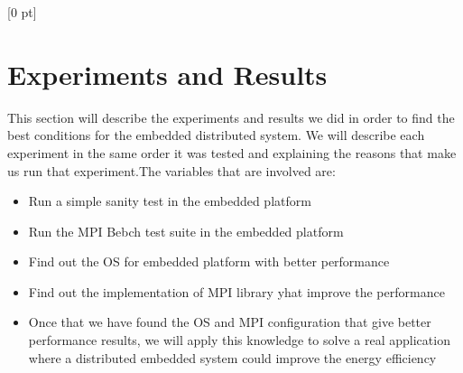 \titlespacing{\chapter}{0 pt}{30 pt}{50 pt}[0 pt]
\titleformat{\section}{\Large\bfseries}{\thesection}{0 pt}{\hspace{30 pt}}
\titleformat{\subsection}{\large\bfseries}{\thesubsection}{0 pt}{\hspace{30 pt}}
\pagestyle{fancy}
\fancyhead[LO,LE]{\footnotesize\emph{\leftmark}}
\fancyhead[RO,RE]{\thepage}
\fancyfoot[CO,CE]{}

\chapter{Experiments and Results}

\normalsize
\noindent

This section will describe the experiments and results we did in order to find
the best conditions for the embedded distributed system. We will describe each
experiment in the same order it was tested and explaining the reasons that make
us run that experiment.The variables that are involved are: 

\begin{itemize}
\item Run a simple sanity test in the embedded platform
\item Run the MPI Bebch test suite in the embedded platform
\item Find out the OS for embedded platform with better performance 
\item Find out the implementation of MPI library yhat improve the performance
\item Once that we have found the OS and MPI configuration that give better
performance results, we will apply this knowledge to solve a real application
where a distributed embedded system could improve the energy efficiency
\end{itemize}

